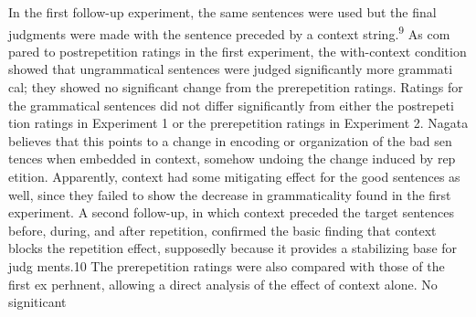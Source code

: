 \begin{styleTextbody}
In the first follow-up experiment, the same sentences were used but the final judgments were made with the sentence preceded by a context string.\textsuperscript{9}\textsuperscript{ }As com\- pared to postrepetition ratings in the first experiment, the with-context condition showed that ungrammatical sentences were judged significantly more grammati\- cal; they showed no significant change from the prerepetition ratings. Ratings for the grammatical sentences did not differ significantly from either the postrepeti\- tion ratings in Experiment 1 or the prerepetition ratings in Experiment 2. Nagata believes that this points to a change in encoding or organization of the bad sen\- tences when embedded in context, somehow undoing the change induced by rep\- etition. Apparently, context had some mitigating effect for the good sentences as well, since they failed to show the decrease in grammaticality found in the first experiment. A second follow-up, in which context preceded the target sentences before, during, and after repetition, confirmed the basic finding that context blocks the repetition effect, supposedly because it provides a stabilizing base for judg\- ments.10 The prerepetition ratings were also compared with those of the first ex\- perhnent, allowing a direct analysis of the effect of context alone. No signiticant
\end{styleTextbody}


